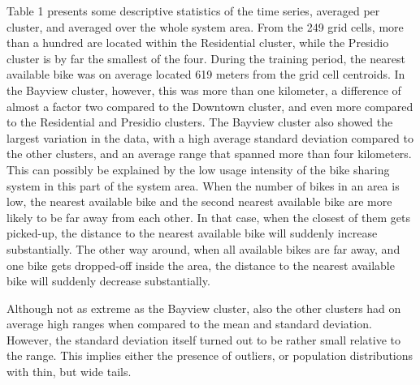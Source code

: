 \documentclass[12pt,oneside]{reedthesis}
\begin{document}
Table 1 presents some descriptive statistics of the time series,
averaged per cluster, and averaged over the whole system area. From the
249 grid cells, more than a hundred are located within the Residential
cluster, while the Presidio cluster is by far the smallest of the four.
During the training period, the nearest available bike was on average
located 619 meters from the grid cell centroids. In the Bayview cluster,
however, this was more than one kilometer, a difference of almost a
factor two compared to the Downtown cluster, and even more compared to
the Residential and Presidio clusters. The Bayview cluster also showed
the largest variation in the data, with a high average standard
deviation compared to the other clusters, and an average range that
spanned more than four kilometers. This can possibly be explained by the
low usage intensity of the bike sharing system in this part of the
system area. When the number of bikes in an area is low, the nearest
available bike and the second nearest available bike are more likely to
be far away from each other. In that case, when the closest of them gets
picked-up, the distance to the nearest available bike will suddenly
increase substantially. The other way around, when all available bikes
are far away, and one bike gets dropped-off inside the area, the
distance to the nearest available bike will suddenly decrease
substantially.

Although not as extreme as the Bayview cluster, also the other clusters
had on average high ranges when compared to the mean and standard
deviation. However, the standard deviation itself turned out to be
rather small relative to the range. This implies either the presence of
outliers, or population distributions with thin, but wide tails.
\end{document}
